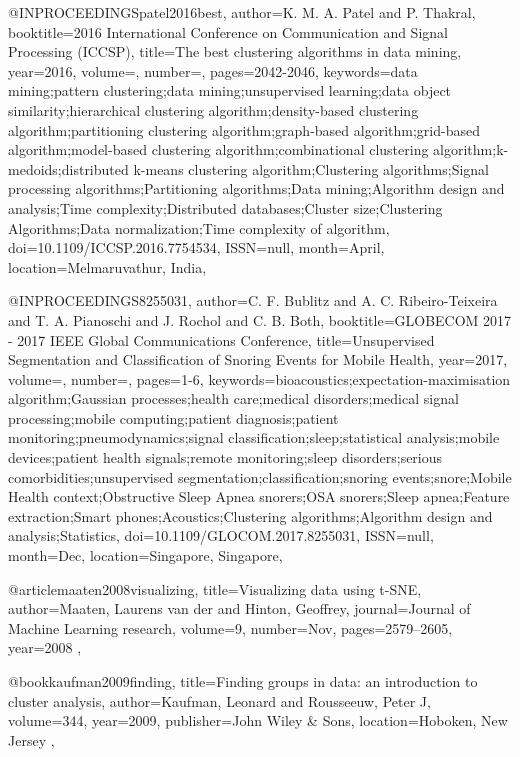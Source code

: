@INPROCEEDINGS{patel2016best, 
author={K. M. A. {Patel} and P. {Thakral}}, 
booktitle={2016 International Conference on Communication and Signal Processing (ICCSP)}, 
title={The best clustering algorithms in data mining}, 
year={2016}, 
volume={}, 
number={}, 
pages={2042-2046}, 
keywords={data mining;pattern clustering;data mining;unsupervised learning;data object similarity;hierarchical clustering algorithm;density-based clustering algorithm;partitioning clustering algorithm;graph-based algorithm;grid-based algorithm;model-based clustering algorithm;combinational clustering algorithm;k-medoids;distributed k-means clustering algorithm;Clustering algorithms;Signal processing algorithms;Partitioning algorithms;Data mining;Algorithm design and analysis;Time complexity;Distributed databases;Cluster size;Clustering Algorithms;Data normalization;Time complexity of algorithm}, 
doi={10.1109/ICCSP.2016.7754534}, 
ISSN={null}, 
month={April},
location={Melmaruvathur, India},
}

@INPROCEEDINGS{8255031, 
author={C. F. {Bublitz} and A. C. {Ribeiro-Teixeira} and T. A. {Pianoschi} and J. {Rochol} and C. B. {Both}}, 
booktitle={GLOBECOM 2017 - 2017 IEEE Global Communications Conference}, 
title={Unsupervised Segmentation and Classification of Snoring Events for Mobile Health}, 
year={2017}, 
volume={}, 
number={}, 
pages={1-6}, 
keywords={bioacoustics;expectation-maximisation algorithm;Gaussian processes;health care;medical disorders;medical signal processing;mobile computing;patient diagnosis;patient monitoring;pneumodynamics;signal classification;sleep;statistical analysis;mobile devices;patient health signals;remote monitoring;sleep disorders;serious comorbidities;unsupervised segmentation;classification;snoring events;snore;Mobile Health context;Obstructive Sleep Apnea snorers;OSA snorers;Sleep apnea;Feature extraction;Smart phones;Acoustics;Clustering algorithms;Algorithm design and analysis;Statistics}, 
doi={10.1109/GLOCOM.2017.8255031}, 
ISSN={null}, 
month={Dec},
location={Singapore, Singapore}},

@article{maaten2008visualizing,
  title={Visualizing data using t-SNE},
  author={Maaten, Laurens van der and Hinton, Geoffrey},
  journal={Journal of Machine Learning research},
  volume={9},
  number={Nov},
  pages={2579--2605},
  year={2008}
},

@book{kaufman2009finding,
  title={Finding groups in data: an introduction to cluster analysis},
  author={Kaufman, Leonard and Rousseeuw, Peter J},
  volume={344},
  year={2009},
  publisher={John Wiley \& Sons},
  location={Hoboken, New Jersey}
},

